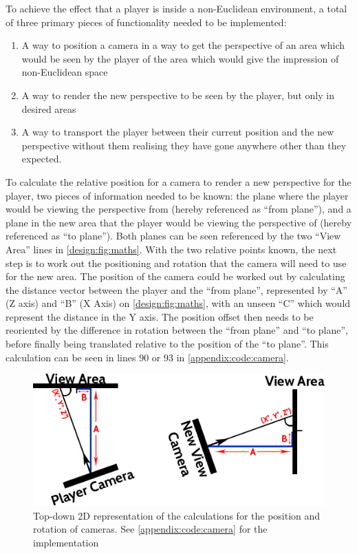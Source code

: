 		To achieve the effect that a player is inside a non-Euclidean environment, a total of three primary pieces of functionality needed to be implemented:
		\begin{enumerate}
			\item A way to position a camera in a way to get the perspective of an area which would be seen by the player of the area which would give the impression of non-Euclidean space
			\item A way to render the new perspective to be seen by the player, but only in desired areas
			\item A way to transport the player between their current position and the new perspective without them realising they have gone anywhere other than they expected.
		\end{enumerate}

		To calculate the relative position for a camera to render a new perspective for the player, two pieces of information needed to be known: the plane where the player would be viewing the perspective from (hereby referenced as \enquote{from plane}), and a plane in the new area that the player would be viewing the perspective of (hereby referenced as \enquote{to plane}). Both planes can be seen referenced by the two \enquote{View Area} lines in \autoref{design:fig:maths}.
		With the two relative points known, the next step is to work out the positioning and rotation that the camera will need to use for the new area.
		The position of the camera could be worked out by calculating the distance vector between the player and the \enquote{from plane}, represented by \enquote{A} (Z axis) and \enquote{B} (X Axis) on \autoref{design:fig:maths}, with an unseen \enquote{C} which would represent the distance in the Y axis.
		The position offset then needs to be reoriented by the difference in rotation between the \enquote{from plane} and \enquote{to plane}, before finally being translated relative to the position of the \enquote{to plane}.
		This calculation can be seen in lines 90 or 93 in \autoref{appendix:code:camera}.

		\begin{figure}[h]
			\includegraphics[width=1\textwidth]{Images/Position}
			\centering
			\caption{Top-down 2D representation of the calculations for the position and rotation of cameras.
				See \autoref{appendix:code:camera} for the implementation}
			\label{design:fig:maths}
		\end{figure}

